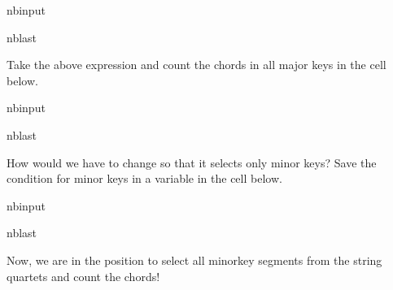 \documentclass[letterpaper,10pt,english]{sphinxmanual}
\begin{document}
\begin{sphinxuseclass}{nbinput}
\begin{sphinxuseclass}{nblast}
{
\begin{sphinxVerbatim}[commandchars=\\\{\}]
\llap{\color{nbsphinxin}[ ]:\,\hspace{\fboxrule}\hspace{\fboxsep}}\PYG{p}{[} \PYG{p}{[}\PYG{p}{]} \PYG{p}{]}
\end{sphinxVerbatim}
}

\end{sphinxuseclass}
\end{sphinxuseclass}
\sphinxAtStartPar
Take the above expression and count the chords in all major keys in the cell below.

\begin{sphinxuseclass}{nbinput}
\begin{sphinxuseclass}{nblast}
{
\begin{sphinxVerbatim}[commandchars=\\\{\}]
\llap{\color{nbsphinxin}[ ]:\,\hspace{\fboxrule}\hspace{\fboxsep}}
\end{sphinxVerbatim}
}

\end{sphinxuseclass}
\end{sphinxuseclass}
\sphinxAtStartPar
How would we have to change  so that it selects only minor keys? Save the condition for minor keys in a variable  in the cell below.

\begin{sphinxuseclass}{nbinput}
\begin{sphinxuseclass}{nblast}
{
\begin{sphinxVerbatim}[commandchars=\\\{\}]
\llap{\color{nbsphinxin}[ ]:\,\hspace{\fboxrule}\hspace{\fboxsep}}
\end{sphinxVerbatim}
}

\end{sphinxuseclass}
\end{sphinxuseclass}
\sphinxAtStartPar
Now, we are in the position to select all minor\sphinxhyphen{}key segments from the string quartets and count the chords!
\end{document}
